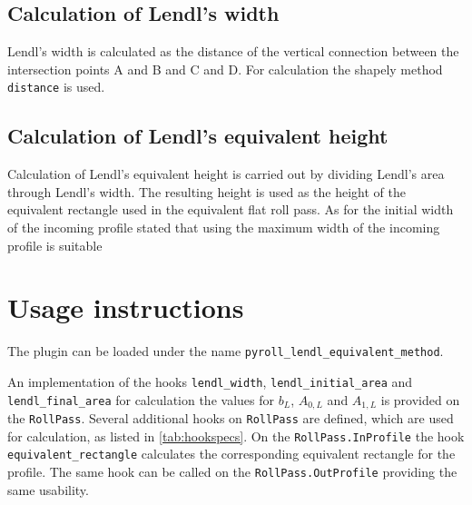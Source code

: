 \documentclass[11pt]{PyRollDocs}
\begin{document}
    \newpage

    \subsection{Calculation of Lendl's width}\label{subsec:lendl-width}
    Lendl's width is calculated as the distance of the vertical connection between the intersection points A and B and C and D.
    For calculation the shapely method \texttt{distance} is used.

    \subsection{Calculation of Lendl's equivalent height}\label{subsec:lendl-height}
    Calculation of Lendl's equivalent height is carried out by dividing Lendl's area through Lendl's width.
    The resulting height is used as the height of the equivalent rectangle used in the equivalent flat roll pass.
    As for the initial width of the incoming profile \textcite{Mauk_Kopp_1982} stated that using the maximum width of the incoming profile is suitable


    \section{Usage instructions}\label{sec:usage-instructions}

    The plugin can be loaded under the name \texttt{pyroll\_lendl\_equivalent\_method}.

    An implementation of the hooks \lstinline{lendl_width}, \lstinline{lendl_initial_area} and \lstinline{lendl_final_area}
    for calculation the values for $b_L$, $A_{0,L}$ and $A_{1,L}$ is provided on the \lstinline{RollPass}.
    Several additional hooks on \lstinline{RollPass} are defined, which are used for calculation, as listed in \autoref{tab:hookspecs}.
    On the \lstinline{RollPass.InProfile} the hook \lstinline{equivalent_rectangle} calculates the corresponding equivalent rectangle for the profile.
    The same hook can be called on the \lstinline{RollPass.OutProfile} providing the same usability.
\end{document}
